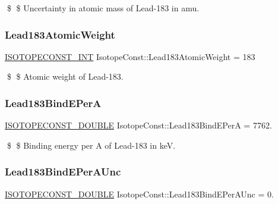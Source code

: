 \$ \$ Uncertainty in atomic mass of Lead-\/183 in amu. \mbox{\label{group___isotope_const-_lead-_pb183_gae2d00397fe1c8482911753589697fdca}} 
\subsubsection{\texorpdfstring{Lead183\+Atomic\+Weight}{Lead183AtomicWeight}}
{\footnotesize\ttfamily \mbox{\hyperlink{group___isotope_const-_macros_ga5f18360b3e99483a35c32d789e62621c}{I\+S\+O\+T\+O\+P\+E\+C\+O\+N\+S\+T\+\_\+\+I\+NT}} Isotope\+Const\+::\+Lead183\+Atomic\+Weight = 183}

\$ \$ Atomic weight of Lead-\/183. \mbox{\label{group___isotope_const-_lead-_pb183_ga9a6da8696ea9afbfb9dc2402732ee7cc}} 
\subsubsection{\texorpdfstring{Lead183\+Bind\+E\+PerA}{Lead183BindEPerA}}
{\footnotesize\ttfamily \mbox{\hyperlink{group___isotope_const-_macros_ga8f45a7272ce02c0b4c65c44636ed719a}{I\+S\+O\+T\+O\+P\+E\+C\+O\+N\+S\+T\+\_\+\+D\+O\+U\+B\+LE}} Isotope\+Const\+::\+Lead183\+Bind\+E\+PerA = 7762.}

\$ \$ Binding energy per A of Lead-\/183 in keV. \mbox{\label{group___isotope_const-_lead-_pb183_gac79df5a328ba2de2c0bf590214208a82}} 
\subsubsection{\texorpdfstring{Lead183\+Bind\+E\+Per\+A\+Unc}{Lead183BindEPerAUnc}}
{\footnotesize\ttfamily \mbox{\hyperlink{group___isotope_const-_macros_ga8f45a7272ce02c0b4c65c44636ed719a}{I\+S\+O\+T\+O\+P\+E\+C\+O\+N\+S\+T\+\_\+\+D\+O\+U\+B\+LE}} Isotope\+Const\+::\+Lead183\+Bind\+E\+Per\+A\+Unc = 0.}

